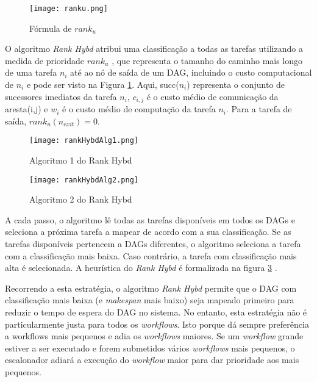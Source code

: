 \begin{figure}[H]
	\centering
	\texttt{[image: ranku.png]}
	\caption{Fórmula de $rank_u$}
	\label{ranku}
\end{figure}

O algoritmo \textit{Rank Hybd} atribui uma classificação a todas as tarefas utilizando a medida de prioridade $rank_u$ \cite{Topcuoglu2002}, que representa o tamanho do caminho mais longo de uma tarefa $n_i$ até ao nó de saída de um DAG, incluindo o custo computacional de $n_i$ e pode ser visto na Figura \ref{ranku}. Aqui, succ($n_i$) representa o conjunto de sucessores imediatos da tarefa $n_i$, $c_{i,j}$ é o custo médio de comunicação da aresta(i,j) e $w_i$ é o custo médio de computação da tarefa $n_i$. Para a tarefa de saída, $rank_u(n_{exit}) = 0$.

\begin{figure}[H]
	\centering
	\texttt{[image: rankHybdAlg1.png]}
	\caption{Algoritmo 1 do Rank Hybd}
	\label{rankHybdAlg1}
\end{figure}


\begin{figure}[H]
	\centering
	\texttt{[image: rankHybdAlg2.png]}
	\caption{Algoritmo 2 do Rank Hybd}
	\label{rankHybdAlg2}
\end{figure}

A cada passo, o algoritmo lê todas as tarefas disponíveis em todos os DAGs e seleciona a próxima tarefa a mapear de acordo com a sua classificação. Se as tarefas disponíveis pertencem a DAGs diferentes, o algoritmo seleciona a tarefa com a classificação mais baixa. Caso contrário, a tarefa com classificação mais alta é selecionada. A heurística do \textit{Rank Hybd} é formalizada na figura \ref{rankHybdAlg2} \cite{Arabnejad}.

Recorrendo a esta estratégia, o algoritmo \textit{Rank Hybd} permite que o DAG com classificação mais baixa (e \textit{makespan} mais baixo) seja mapeado primeiro para reduzir o tempo de espera do DAG no sistema. No entanto, esta estratégia não é particularmente justa para todos os \textit{workflows}. Isto porque dá sempre preferência a workflows mais pequenos e adia os \textit{workflows} maiores. Se um \textit{workflow} grande estiver a ser executado e forem submetidos vários \textit{workflows} mais pequenos, o escalonador adiará a execução do \textit{workflow} maior para dar prioridade aos mais pequenos.

